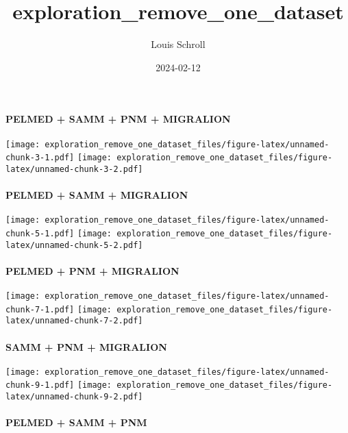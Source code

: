 \documentclass[
]{article}
\title{exploration\_remove\_one\_dataset}
\author{Louis Schroll}
\date{2024-02-12}
\begin{document}
\maketitle

\hypertarget{pelmed-samm-pnm-migralion}{%
\paragraph{PELMED + SAMM + PNM +
MIGRALION}\label{pelmed-samm-pnm-migralion}}

\texttt{[image: exploration\_remove\_one\_dataset\_files/figure-latex/unnamed-chunk-3-1.pdf]}
\texttt{[image: exploration\_remove\_one\_dataset\_files/figure-latex/unnamed-chunk-3-2.pdf]}

\hypertarget{pelmed-samm-migralion}{%
\paragraph{PELMED + SAMM + MIGRALION}\label{pelmed-samm-migralion}}

\texttt{[image: exploration\_remove\_one\_dataset\_files/figure-latex/unnamed-chunk-5-1.pdf]}
\texttt{[image: exploration\_remove\_one\_dataset\_files/figure-latex/unnamed-chunk-5-2.pdf]}

\hypertarget{pelmed-pnm-migralion}{%
\paragraph{PELMED + PNM + MIGRALION}\label{pelmed-pnm-migralion}}

\texttt{[image: exploration\_remove\_one\_dataset\_files/figure-latex/unnamed-chunk-7-1.pdf]}
\texttt{[image: exploration\_remove\_one\_dataset\_files/figure-latex/unnamed-chunk-7-2.pdf]}

\hypertarget{samm-pnm-migralion}{%
\paragraph{SAMM + PNM + MIGRALION}\label{samm-pnm-migralion}}

\texttt{[image: exploration\_remove\_one\_dataset\_files/figure-latex/unnamed-chunk-9-1.pdf]}
\texttt{[image: exploration\_remove\_one\_dataset\_files/figure-latex/unnamed-chunk-9-2.pdf]}

\hypertarget{pelmed-samm-pnm}{%
\paragraph{PELMED + SAMM + PNM}\label{pelmed-samm-pnm}}
\end{document}
